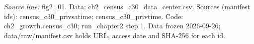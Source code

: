 {\scriptsize\textit{Source line:} fig2\_\allowbreak{}01. Data: ch2\_\allowbreak{}census\_\allowbreak{}c30\_\allowbreak{}data\_\allowbreak{}center.csv. Sources (manifest ids): census\_\allowbreak{}c30\_\allowbreak{}privsatime; census\_\allowbreak{}c30\_\allowbreak{}privtime. Code: ch2\_\allowbreak{}growth.census\_\allowbreak{}c30; run\_\allowbreak{}chapter2 step 1. Data frozen 2026-09-26; data/raw/manifest.csv holds URL, access date and SHA-256 for each id.}